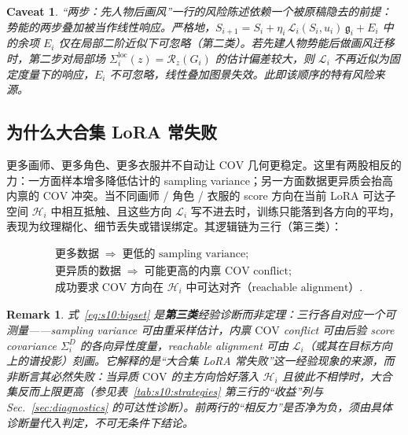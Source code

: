 \documentclass[11pt,a4paper]{article}
\newtheorem{remark}[theorem]{Remark}
\newtheorem{caveat}[theorem]{Caveat}
\newcommand{\cH}{\mathcal{H}}   %
\newcommand{\cL}{\mathcal{L}}   %
\newcommand{\Rstr}{\mathcal{R}}     %
\newcommand{\COV}{\mathrm{COV}}     %
\newcommand{\gres}{\bm{\mathfrak{g}}} %
\begin{document}
\begin{caveat}\label{rem:s10:linear}
“两步：先人物后画风”一行的风险陈述依赖一个被原稿隐去的前提：势能的两步叠加被当作线性响应。严格地，$S_{i+1}=S_i+\eta_i\,\cL_i(S_i,u_i)\,\gres_i+E_i$ 中的余项 $E_i$ 仅在局部二阶近似下可忽略（第二类）。若先建人物势能后做画风迁移时，第二步对局部场 $\Sigma_i^{\mathrm{loc}}(z)=\Rstr_z(G_i)$ 的估计偏差较大，则 $\cL_i$ 不再近似为固定度量下的响应，$E_i$ 不可忽略，线性叠加图景失效。此即该顺序的特有风险来源。
\end{caveat}

\subsection{为什么大合集 LoRA 常失败}\label{subsec:s10:bigset}

更多画师、更多角色、更多衣服并不自动让 $\COV$ 几何更稳定。这里有两股相反的力：一方面样本增多降低估计的 sampling variance；另一方面数据更异质会抬高内禀的 $\COV$ 冲突。当不同画师 / 角色 / 衣服的 score 方向在当前 LoRA 可达子空间 $\cH_i$ 中相互抵触、且这些方向 $\cL_i$ 写不进去时，训练只能落到各方向的平均，表现为纹理糊化、细节丢失或错误绑定。其逻辑链为三行（第三类）：

\begin{equation}\label{eq:s10:bigset}
\boxed{
\begin{aligned}
&\text{更多数据}\;\Longrightarrow\;\text{更低的 sampling variance};\\
&\text{更异质的数据}\;\Longrightarrow\;\text{可能更高的内禀 }\COV\text{ conflict};\\
&\text{成功要求}\;\COV\text{ 方向在 }\cH_i\text{ 中可达对齐（reachable alignment）}.
\end{aligned}}
\end{equation}

\begin{remark}\label{rem:s10:bigset}
式~\eqref{eq:s10:bigset} 是\textbf{第三类}经验诊断而非定理：三行各自对应一个可测量——sampling variance 可由重采样估计，内禀 $\COV$ conflict 可由后验 score covariance $\Sigma_i^D$ 的各向异性度量，reachable alignment 可由 $\cL_i$（或其在目标方向上的谱投影）刻画。它解释的是“大合集 LoRA 常失败”这一经验现象的来源，而非断言其必然失败：当异质 $\COV$ 的主方向恰好落入 $\cH_i$ 且彼此不相悖时，大合集反而上限更高（参见表~\ref{tab:s10:strategies} 第三行的“收益”列与 Sec.~\ref{sec:diagnostics} 的可达性诊断）。前两行的“相反力”是否净为负，须由具体诊断量代入判定，不可无条件下结论。
\end{remark}

\end{document}
